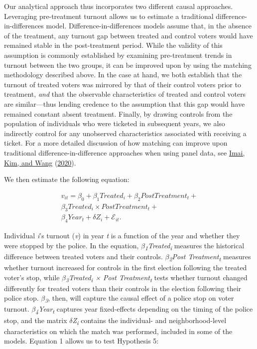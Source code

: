 \documentclass[
  12pt,
]{article}
\begin{document}
Our analytical approach thus incorporates two different causal approaches. Leveraging pre-treatment turnout allows us to estimate a traditional difference-in-differences model. Difference-in-differences models assume that, in the absence of the treatment, any turnout gap between treated and control voters would have remained stable in the post-treatment period. While the validity of this assumption is commonly established by examining pre-treatment trends in turnout between the two groups, it can be improved upon by using the matching methodology described above. In the case at hand, we both establish that the turnout of treated voters was mirrored by that of their control voters prior to treatment, \emph{and} that the observable characteristics of treated and control voters are similar---thus lending credence to the assumption that this gap would have remained constant absent treatment. Finally, by drawing controls from the population of individuals who were ticketed in subsequent years, we also indirectly control for any unobserved characteristics associated with receiving a ticket. For a more detailed discussion of how matching can improve upon traditional difference-in-difference approaches when using panel data, see \protect\hyperlink{ref-Imai2020}{Imai, Kim, and Wang} (\protect\hyperlink{ref-Imai2020}{2020}).

We then estimate the following equation:

\begin{gather}
\label{eq:1}
v_{it}=\beta_0+\beta_1Treated_{i}+\beta_2Post Treatment_{t} + \nonumber \\
\beta_3Treated_{i}\times Post Treatment_{t} + \\
\beta_4Year_{t} + \delta{Z}_{i} + \mathcal{E}_{it}. \nonumber
\end{gather}

Individual \emph{i}'s turnout (\emph{v}) in year \emph{t} is a function of the year and whether they were stopped by the police. In the equation, \emph{\(\beta\)\textsubscript{1}Treated\textsubscript{i}} measures the historical difference between treated voters and their controls. \emph{\(\beta\)\textsubscript{2}Post Treatment\textsubscript{t}} measures whether turnout increased for controls in the first election following the treated voter's stop, while \emph{\(\beta\)\textsubscript{3}Treated\textsubscript{i} × Post Treatment\textsubscript{t}} tests whether turnout changed differently for treated voters than their controls in the election following their police stop. \emph{\(\beta\)\textsubscript{3}}, then, will capture the causal effect of a police stop on voter turnout. \emph{\(\beta\)\textsubscript{4}Year\textsubscript{t}} captures year fixed-effects depending on the timing of the police stop, and the matrix \emph{\(\delta\)Z\textsubscript{i}} contains the individual- and neighborhood-level characteristics on which the match was performed, included in some of the models. Equation 1 allows us to test Hypothesis 5:
\end{document}
